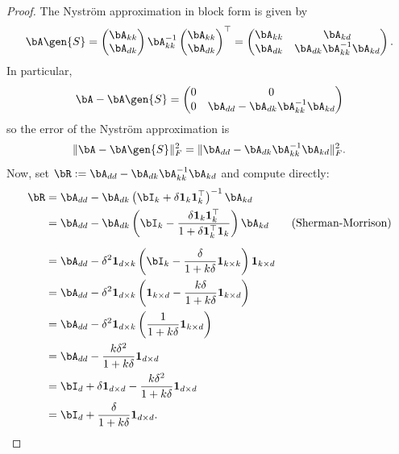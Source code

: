 \begin{proof}
\vspace{1em}
The Nystr\"om approximation in block form is given by
\[\bA\gen{S} = \begin{pmatrix}
    \bA_{kk}\\
    \bA_{dk}
\end{pmatrix} \bA_{kk}^{-1}\begin{pmatrix}
    \bA_{kk}\\
    \bA_{dk}
\end{pmatrix}^\top = \begin{pmatrix}
    \bA_{kk} & \bA_{kd}\\
    \bA_{dk} & \bA_{dk}\bA_{kk}^{-1}\bA_{kd}
\end{pmatrix}.\]
In particular,
\[\bA - \bA\gen{S} = \begin{pmatrix}
    0 & 0\\
    0 & \bA_{dd} - \bA_{dk}\bA_{kk}^{-1}\bA_{kd}
\end{pmatrix}\]
so the error of the Nystr\"om approximation is
\[\|\bA - \bA\gen{S}\|^2_F = \|\bA_{dd} - \bA_{dk}\bA_{kk}^{-1}\bA_{kd}\|^2_F.\]
Now, set $\bR := \bA_{dd} - \bA_{dk}\bA_{kk}^{-1}\bA_{kd}$ and compute directly:
\begin{align*}
    \bR &= \bA_{dd}- \bA_{dk}\left(\bI_k + \delta \mathbf{1}_k\mathbf{1}_k^\top\right)^{-1}\bA_{kd}\\
    &=\bA_{dd}- \bA_{dk}\left(\bI_k - \frac{\delta \mathbf{1}_k\mathbf{1}_k^\top}{1+\delta \mathbf{1}_k^\top\mathbf{1}_k}\right)\bA_{kd}\qquad\text{(Sherman-Morrison)}\\[5pt]
    &=\bA_{dd}-\delta^2 \mathbf{1}_{d\times k}\left(\bI_k - \frac{\delta }{1+k\delta}\mathbf{1}_{k\times k}\right)\mathbf{1}_{k\times d}\\
    &=\bA_{dd}-\delta^2 \mathbf{1}_{d\times k}\left(\mathbf{1}_{k\times d} - \frac{k\delta}{1+k\delta}\mathbf{1}_{k\times d}\right)\\
    &=\bA_{dd}-\delta^2 \mathbf{1}_{d\times k}\left(\frac{1}{1+k\delta}\mathbf{1}_{k\times d}\right)\\
    &=\bA_{dd} - \frac{k\delta^2}{1+k\delta}\mathbf{1}_{d\times d}\\
    &= \bI_d + \delta\mathbf{1}_{d\times d} - \frac{k\delta^2}{1+k\delta}\mathbf{1}_{d\times d}\\
    &= \bI_d + \frac{\delta}{1+k\delta}\mathbf{1}_{d\times d}.\\
\end{align*}


\end{proof}
